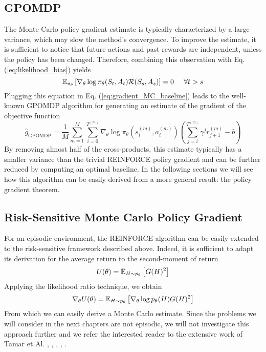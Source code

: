 \subsection{GPOMDP}
The Monte Carlo policy gradient estimate is typically characterized by a large variance, which may slow the method's convergence. To improve the estimate, it is sufficient to notice that future actions and past rewards are independent, unless the policy has been changed. Therefore, combining this observation with Eq. (\ref{eq:likelihood_bias}) yields
\begin{equation*}
	\E[\pi_\theta]{\nabla_\theta\log \pi_\theta(S_t, A_t) \calR(S_s, A_s)} = 0
	\;\;\;\;\; \forall t>s
\end{equation*}
Plugging this equation in Eq. (\ref{eq:gradient_MC_baseline}) leads to the well-known GPOMDP algorithm \cite{baxter2001infinite} for generating an estimate of the gradient of
the objective function
\begin{equation}
\label{eq:GPOMDP}
	\widehat{g}_{\text{GPOMDP}} = \frac{1}{M} \sum^{M}_{m=1} \sum_{i=0}^{T^{(m)}} 
	\nabla_\theta \log \pi_\theta(s_i^{(m)}, a_i^{(m)}) \left( 
	\sum^{T^{(m)}}_{j=i} \gamma^j r_{j+1}^{(m)} - b \right)
\end{equation}
By removing almost half of the cross-products, this estimate typically has a smaller variance than the trivial REINFORCE policy gradient and can be further reduced by computing an optimal baseline. In the following sections we will see how this algorithm can be easily derived from a more general result: the policy gradient theorem. 

\subsection{Risk-Sensitive Monte Carlo Policy Gradient}
For an episodic environment, the REINFORCE algorithm can be easily extended to the risk-sensitive framework described above. Indeed, it is sufficient to adapt its derivation for the average return to the second-moment of return
\begin{equation*}
	U(\theta) = \E[H\sim p_\theta]{G(H)^2}
\end{equation*}
Applying the likelihood ratio technique, we obtain
\begin{equation*}
	\nabla_\theta U(\theta) = \E[H\sim p_\theta]{\nabla_\theta \log p_\theta(H) G(H)^2}
\end{equation*}
From which we can easily derive a Monte Carlo estimate. Since the problems we will consider in the next chapters are not episodic, we will not investigate this approach further and we refer the interested reader to the extensive work of Tamar et Al. \cite{tamar2012policy}, \cite{tamar2013temporal}, \cite{tamar2013variance}, \cite{tamar2015policy}, \cite{chow2015risk}.

